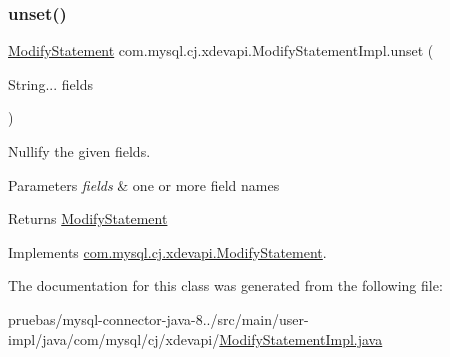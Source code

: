 \subsubsection{\texorpdfstring{unset()}{unset()}}
{\footnotesize\ttfamily \mbox{\hyperlink{interfacecom_1_1mysql_1_1cj_1_1xdevapi_1_1_modify_statement}{Modify\+Statement}} com.\+mysql.\+cj.\+xdevapi.\+Modify\+Statement\+Impl.\+unset (\begin{DoxyParamCaption}\item[{String...}]{fields }\end{DoxyParamCaption})}

Nullify the given fields.


\begin{DoxyParams}{Parameters}
{\em fields} & one or more field names \\
\hline
\end{DoxyParams}
\begin{DoxyReturn}{Returns}
\mbox{\hyperlink{interfacecom_1_1mysql_1_1cj_1_1xdevapi_1_1_modify_statement}{Modify\+Statement}} 
\end{DoxyReturn}


Implements \mbox{\hyperlink{interfacecom_1_1mysql_1_1cj_1_1xdevapi_1_1_modify_statement_a32c8da3dfdab70bf211d44db0c2f7ca2}{com.\+mysql.\+cj.\+xdevapi.\+Modify\+Statement}}.



The documentation for this class was generated from the following file\+:\begin{DoxyCompactItemize}
\item 
pruebas/mysql-\/connector-\/java-\/8../src/main/user-\/impl/java/com/mysql/cj/xdevapi/\mbox{\hyperlink{_modify_statement_impl_8java}{Modify\+Statement\+Impl.\+java}}\end{DoxyCompactItemize}
